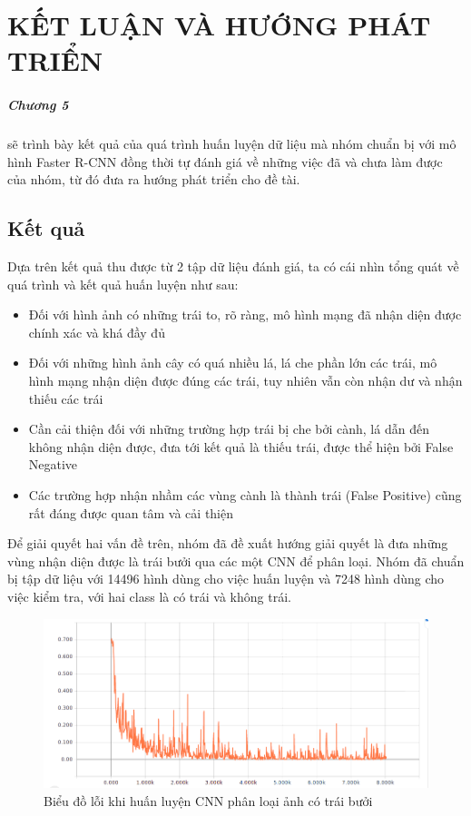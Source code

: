 \chapter{KẾT LUẬN VÀ HƯỚNG PHÁT TRIỂN}
\label{conclusion}
\paragraph{Chương 5} sẽ trình bày kết quả của quá trình huấn luyện dữ liệu mà nhóm chuẩn bị với mô hình Faster R-CNN đồng thời tự đánh giá về những việc đã và chưa làm được của nhóm, từ đó đưa ra hướng phát triển cho đề tài.

\section{Kết quả}
Dựa trên kết quả thu được từ 2 tập dữ liệu đánh giá, ta có cái nhìn tổng quát về quá trình và kết quả huấn luyện như sau:
\begin{itemize}
	\item Đối với hình ảnh có những trái to, rõ ràng, mô hình mạng đã nhận diện được chính xác và khá đầy đủ
	\item Đối với những hình ảnh cây có quá nhiều lá, lá che phần lớn các trái, mô hình mạng nhận diện được đúng các trái, tuy nhiên vẫn còn nhận dư và nhận thiếu các trái
	\item Cần cải thiện đối với những trường hợp trái bị che bởi cành, lá dẫn đến không nhận diện được, đưa tới kết quả là thiếu trái, được thể hiện bởi False Negative
	\item Các trường hợp nhận nhầm các vùng cành là thành trái (False Positive) cũng rất đáng được quan tâm và cải thiện
\end{itemize}
Để giải quyết hai vấn đề trên, nhóm đã đề xuất hướng giải quyết là đưa những vùng nhận diện được là trái bưởi qua các một CNN để phân loại.
Nhóm đã chuẩn bị tập dữ liệu với 14496 hình dùng cho việc huấn luyện và 7248 hình dùng cho việc kiểm tra, với hai class là có trái và không trái.
\begin{center}
    \begin{figure}[H]
    \centering
    \includegraphics[width=0.7\columnwidth]{images/chap3/loss_cls_full.png}
    \caption{Biểu đồ lỗi khi huấn luyện CNN phân loại ảnh có trái bưởi}
    \label{fig:my_label}
    \end{figure}
\end{center}

